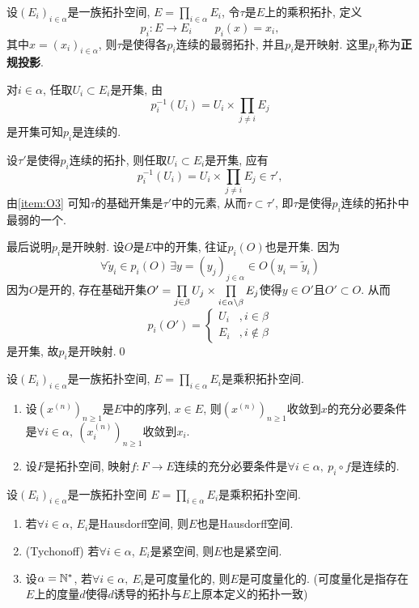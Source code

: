 \begin{Theorem}
	设$ (E_i)_{i\in\alpha} $是一族拓扑空间, $ E=\prod_{i\in\alpha}E_i $, 令$ \tau $是$ E $上的乘积拓扑, 定义
	\[
		p_i : E\to E_i\qquad p_i(x)=x_i,
	\]
	其中$ x=(x_i)_{i\in\alpha} $, 则$ \tau $是使得各$ p_i $连续的最弱拓扑, 并且$ p_i $是开映射. 这里$ p_i $称为\textbf{正规投影}.
\end{Theorem}
\begin{Proof}
	对$ i\in\alpha $, 任取$ U_i\subset E_i $是开集, 由
	\[
		p_i^{-1}(U_i)=U_i\times\prod_{j\ne i}E_j
	\]
	是开集可知$ p_i $是连续的.

	设$ \tau' $是使得$ p_i $连续的拓扑, 则任取$ U_i\subset E_i $是开集, 应有
	\[
		p_i^{-1}(U_i)=U_i\times\prod_{j\ne i}E_j\in\tau',
	\]
	由\ref{item:O3} 可知$ \tau $的基础开集是$ \tau' $中的元素, 从而$ \tau\subset\tau' $, 即$ \tau $是使得$ p_i $连续的拓扑中最弱的一个.

	最后说明$ p_i $是开映射. 设$ O $是$ E $中的开集, 往证$ p_i(O) $也是开集. 因为
	\[
		\forall \tilde{y}_i\in p_i(O)\,\exists y=(y_j)_{j\in\alpha}\in O(y_i=\tilde{y}_i)
	\]
	因为$ O $是开的, 存在基础开集$ O'=\prod\limits_{j\in\beta}U_j\times\prod\limits_{i\in\alpha\setminus\beta}E_j $使得$ y\in O' $且$ O'\subset O $. 从而
	\[
		p_i(O')=\begin{cases}
			U_i & ,i\in\beta \\ E_i &, i\notin\beta
		\end{cases}
	\]
	是开集, 故$ p_i $是开映射.\qed
\end{Proof}

\begin{Corollary}
	设$ (E_i)_{i\in\alpha} $是一族拓扑空间, $ E=\prod\limits_{i\in\alpha}E_i $是乘积拓扑空间.
	\begin{enumerate}[(1)]
		\item 设$ (x^{(n)})_{n\geqslant 1} $是$ E $中的序列, $ x\in E $, 则$ (x^{(n)})_{n\geqslant 1} $收敛到$ x $的充分必要条件是$\forall i\in\alpha,\  (x_i^{(n)})_{n\geqslant 1} $收敛到$ x_i $.

		\item 设$ F $是拓扑空间, 映射$ f : F\to E $连续的充分必要条件是$ \forall i\in\alpha,\ p_i\circ f $是连续的.
	\end{enumerate}
\end{Corollary}

\begin{Proposition}\label{prop:乘积拓扑空间的继承性质}
	设$ (E_i)_{i\in\alpha} $是一族拓扑空间 $ E=\prod\limits_{i\in\alpha}E_i $是乘积拓扑空间.
	\begin{enumerate}[(1)]
		\item 若$ \forall i\in\alpha $, $ E_i $是Hausdorff空间, 则$ E $也是Hausdorff空间.

		\item (Tychonoff) 若$ \forall i\in\alpha $, $ E_i $是紧空间, 则$ E $也是紧空间.

		\item 设$ \alpha=\mathbb{N}^\ast $, 若$ \forall i\in\alpha,\ E_i $是可度量化的, 则$ E $是可度量化的. (可度量化是指存在$ E $上的度量$ d $使得$ d $诱导的拓扑与$ E $上原本定义的拓扑一致)
	\end{enumerate}
\end{Proposition}

